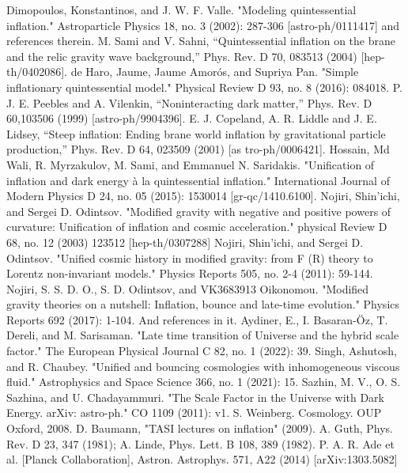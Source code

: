 \documentclass[12pt]{article}  %
\begin{document}
\begin{thebibliography}{99}

 Dimopoulos, Konstantinos, and J. W. F. Valle. "Modeling quintessential inflation." Astroparticle Physics 18, no. 3 (2002): 287-306 [astro-ph/0111417] and references therein.
 M. Sami and V. Sahni, “Quintessential inflation on the brane and the relic gravity wave background,” Phys. Rev. D 70, 083513 (2004) [hep-th/0402086]. 
 de Haro, Jaume, Jaume Amorós, and Supriya Pan. "Simple inflationary quintessential model." Physical Review D 93, no. 8 (2016): 084018. 
 P. J. E. Peebles and A. Vilenkin, “Noninteracting dark matter,” Phys. Rev. D 60,103506 (1999) [astro-ph/9904396]. 
 E. J. Copeland, A. R. Liddle and J. E. Lidsey, “Steep inflation: Ending brane world inflation by gravitational particle production,” Phys. Rev. D 64, 023509 (2001) [as tro-ph/0006421].
 Hossain, Md Wali, R. Myrzakulov, M. Sami, and Emmanuel N. Saridakis. "Unification of inflation and dark energy à la quintessential inflation." International Journal of Modern Physics D 24, no. 05 (2015): 1530014 [gr-qc/1410.6100]. 
 Nojiri, Shin’ichi, and Sergei D. Odintsov. "Modified gravity with negative and positive powers of curvature: Unification of inflation and cosmic acceleration." physical Review D 68, no. 12 (2003) 123512 [hep-th/0307288]
 Nojiri, Shin’ichi, and Sergei D. Odintsov. "Unified cosmic history in modified gravity: from F (R) theory to Lorentz non-invariant models." Physics Reports 505, no. 2-4 (2011): 59-144.
 Nojiri, S. S. D. O., S. D. Odintsov, and VK3683913 Oikonomou. "Modified gravity theories on a nutshell: Inflation, bounce and late-time evolution." Physics Reports 692 (2017): 1-104. And references in it.
 Aydiner, E., I. Basaran-Öz, T. Dereli, and M. Sarisaman. "Late time transition of Universe and the hybrid scale factor." The European Physical Journal C 82, no. 1 (2022): 39.
 Singh, Ashutosh, and R. Chaubey. "Unified and bouncing cosmologies with inhomogeneous viscous fluid." Astrophysics and Space Science 366, no. 1 (2021): 15.
 Sazhin, M. V., O. S. Sazhina, and U. Chadayammuri. "The Scale Factor in the Universe with Dark Energy. arXiv: astro-ph." CO 1109 (2011): v1.
 S. Weinberg. Cosmology. OUP Oxford, 2008.
 D. Baumann, "TASI lectures on inflation" (2009).
 A. Guth, Phys. Rev. D 23, 347 (1981); A. Linde, Phys. Lett. B 108, 389 (1982). 
 P. A. R. Ade et al. [Planck Collaboration], Astron. Astrophys. 571, A22 (2014) [arXiv:1303.5082]

\end{thebibliography}
\end{document}
